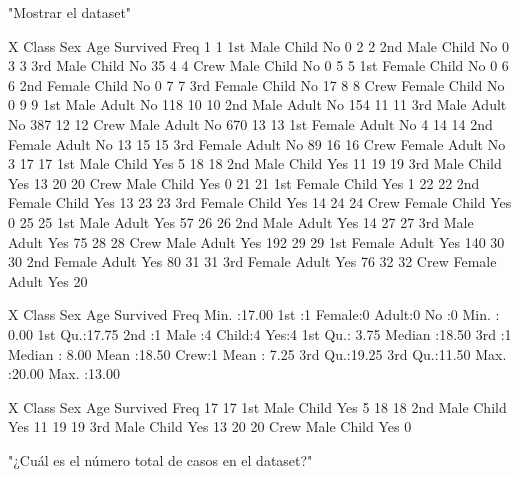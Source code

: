 \documentclass[11pt]{report}
\begin{document}
\begin{Schunk}
\begin{Soutput}
[1] "Mostrar el dataset"
\end{Soutput}
\begin{Soutput}
    X Class    Sex   Age Survived Freq
1   1   1st   Male Child       No    0
2   2   2nd   Male Child       No    0
3   3   3rd   Male Child       No   35
4   4  Crew   Male Child       No    0
5   5   1st Female Child       No    0
6   6   2nd Female Child       No    0
7   7   3rd Female Child       No   17
8   8  Crew Female Child       No    0
9   9   1st   Male Adult       No  118
10 10   2nd   Male Adult       No  154
11 11   3rd   Male Adult       No  387
12 12  Crew   Male Adult       No  670
13 13   1st Female Adult       No    4
14 14   2nd Female Adult       No   13
15 15   3rd Female Adult       No   89
16 16  Crew Female Adult       No    3
17 17   1st   Male Child      Yes    5
18 18   2nd   Male Child      Yes   11
19 19   3rd   Male Child      Yes   13
20 20  Crew   Male Child      Yes    0
21 21   1st Female Child      Yes    1
22 22   2nd Female Child      Yes   13
23 23   3rd Female Child      Yes   14
24 24  Crew Female Child      Yes    0
25 25   1st   Male Adult      Yes   57
26 26   2nd   Male Adult      Yes   14
27 27   3rd   Male Adult      Yes   75
28 28  Crew   Male Adult      Yes  192
29 29   1st Female Adult      Yes  140
30 30   2nd Female Adult      Yes   80
31 31   3rd Female Adult      Yes   76
32 32  Crew Female Adult      Yes   20
\end{Soutput}
\begin{Soutput}
       X          Class       Sex       Age    Survived      Freq      
 Min.   :17.00   1st :1   Female:0   Adult:0   No :0    Min.   : 0.00  
 1st Qu.:17.75   2nd :1   Male  :4   Child:4   Yes:4    1st Qu.: 3.75  
 Median :18.50   3rd :1                                 Median : 8.00  
 Mean   :18.50   Crew:1                                 Mean   : 7.25  
 3rd Qu.:19.25                                          3rd Qu.:11.50  
 Max.   :20.00                                          Max.   :13.00  
\end{Soutput}
\begin{Soutput}
    X Class  Sex   Age Survived Freq
17 17   1st Male Child      Yes    5
18 18   2nd Male Child      Yes   11
19 19   3rd Male Child      Yes   13
20 20  Crew Male Child      Yes    0
\end{Soutput}
\end{Schunk}

\begin{Schunk}
\begin{Soutput}
[1] "¿Cuál es el número total de casos en el dataset?"
\end{Soutput}
\end{Schunk}
\end{document}
